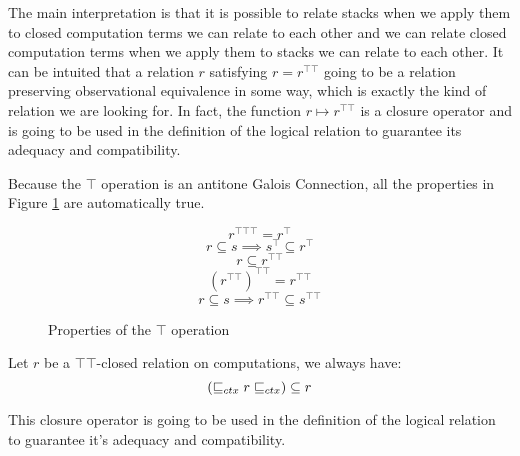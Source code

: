 The main interpretation is that it is possible to 
relate stacks 
when we apply them to closed computation terms we can relate to each other and 
we can relate closed computation terms when we apply them to stacks we can relate to
each other. 
It can be intuited that a relation $r$ satisfying $r = r^{\top\top}$ going 
to be a relation preserving observational equivalence 
in some way, which is exactly the kind of relation 
we are looking for.
In fact, the function $r \mapsto r^{\top\top}$ is a closure operator
and is going to be used in the definition 
of the logical relation to guarantee its adequacy and compatibility.


Because the $\top$ operation is an antitone Galois Connection, 
all the properties in Figure \ref{fig:galois} are automatically true.


\begin{figure}[h]
    \begin{multicols}{3}
        \begin{equation*}
            r^{\top\top\top} = r^\top
        \end{equation*}
        \begin{equation*}
            r \subseteq s \implies s^\top \subseteq r^\top
        \end{equation*}
        \begin{equation*}
            r \subseteq r^{\top\top}
        \end{equation*}
        \begin{equation*}
            (r^{\top\top})^{\top\top} = r^{\top\top}
        \end{equation*}
        \begin{equation*}
            r \subseteq s \implies r^{\top\top} \subseteq s^{\top\top}
        \end{equation*}
    \end{multicols}
    \caption{Properties of the $\top$ operation}
    \label{fig:galois}
\end{figure}


\begin{alemma}
    \label{lem:saturation}
    Let $r$ be a $\top\top$-closed relation on 
    computations, we always have:
    \begin{equation*}
        (\sqsubseteq_{ctx} r \sqsubseteq_{ctx}) \subseteq r 
    \end{equation*}
\end{alemma}

This closure operator is going to be used in the definition 
of the logical relation to guarantee it's adequacy and compatibility.

